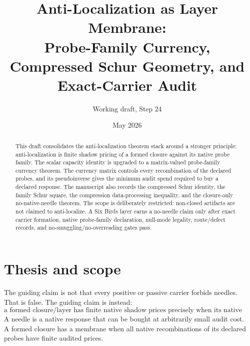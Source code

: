 \documentclass[11pt]{article}
\title{Anti-Localization as Layer Membrane:\\ Probe-Family Currency, Compressed Schur Geometry, and Exact-Carrier Audit}
\author{Working draft, Step 24}
\date{May 2026}
\begin{document}
\maketitle

\begin{abstract}
This draft consolidates the anti-localization theorem stack around a stronger principle: anti-localization is finite shadow pricing of a formed closure against its native probe family.  The scalar capacity identity is upgraded to a matrix-valued probe-family currency theorem.  The currency matrix controls every recombination of the declared probes, and its pseudoinverse gives the minimum audit spend required to buy a declared response.  The manuscript also records the compressed Schur identity, the family Schur square, the compression data-processing inequality, and the closure-only no-native-needle theorem.  The scope is deliberately restricted: non-closed artifacts are not claimed to anti-localize.  A Six Birds layer earns a no-needle claim only after exact carrier formation, native probe-family declaration, null-mode legality, route/defect records, and no-smuggling/no-overreading gates pass.
\end{abstract}

\section{Thesis and scope}

The guiding claim is not that every positive or passive carrier forbids needles.  That is false.  The guiding claim is instead:
\[
\boxed{\text{a formed closure/layer has finite native shadow prices precisely when its native probe-family currency is bounded.}}
\]
A needle is a native response that can be bought at arbitrarily small audit cost.  A formed closure has a membrane when all native recombinations of its declared probes have finite audited prices.
\end{document}
